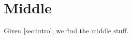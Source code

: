 \documentclass[mainfile]{subfiles}
\begin{document}
\section{Middle}\label{sec:middle}
Given \ref{sec:intro}, we find the middle stuff.
\end{document}
